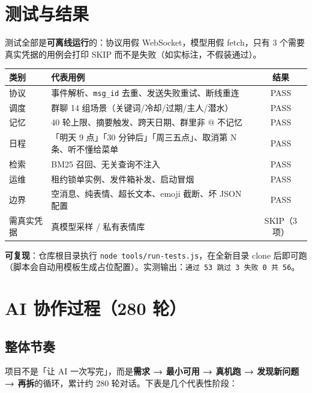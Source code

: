 \documentclass[11pt,a4paper]{ctexart}
\begin{document}
\section{测试与结果}

测试全部是\textbf{可离线运行}的：协议用假 WebSocket，模型用假 fetch，只有 3 个需要真实凭据的用例会打印 SKIP 而不是失败（如实标注，不假装通过）。

\begin{table}[H]
\centering\small
\begin{tabular}{@{}llc@{}}
\toprule
类别 & 代表用例 & 结果 \\
\midrule
协议 & 事件解析、\texttt{msg\_id} 去重、发送失败重试、断线重连 & PASS \\
调度 & 群聊 14 组场景（关键词/冷却/过期/主人/潜水） & PASS \\
记忆 & 40 轮上限、摘要触发、跨天日期、群里非 @ 不记忆 & PASS \\
日程 & 「明天 9 点」「30 分钟后」「周三五点」、取消第 N 条、听不懂给菜单 & PASS \\
检索 & BM25 召回、无关查询不注入 & PASS \\
运维 & 租约锁单实例、发件箱补发、启动冒烟 & PASS \\
边界 & 空消息、纯表情、超长文本、emoji 截断、坏 JSON 配置 & PASS \\
需真实凭据 & 真模型采样 / 私有表情库 & SKIP（3 项） \\
\bottomrule
\end{tabular}
\end{table}

\textbf{可复现}：仓库根目录执行 \texttt{node tools/run-tests.js}，在全新目录 clone 后即可跑（脚本会自动用模板生成占位配置）。实测输出：\texttt{通过 53 跳过 3 失败 0 共 56}。

\section{AI 协作过程（280 轮）}

\subsection{整体节奏}

项目不是「让 AI 一次写完」，而是\textbf{需求 → 最小可用 → 真机跑 → 发现新问题 → 再拆}的循环，累计约 280 轮对话。下表是几个代表性阶段：
\end{document}
